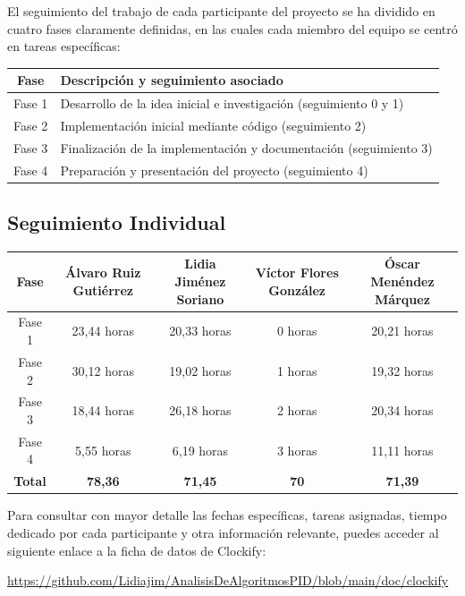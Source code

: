 \documentclass[a4paper]{article}
\begin{document}
El seguimiento del trabajo de cada participante del proyecto se ha dividido en cuatro fases claramente definidas, en las cuales cada miembro del equipo se centró en tareas específicas:
\begin{center}
  \begin{tabular}{|c|l|}
  \hline
  \textbf{Fase} & \textbf{Descripción y seguimiento asociado} \\
  \hline
  Fase 1 & Desarrollo de la idea inicial e investigación (seguimiento 0 y 1) \\
  Fase 2 & Implementación inicial mediante código (seguimiento 2) \\
  Fase 3 & Finalización de la implementación y documentación (seguimiento 3) \\
  Fase 4 & Preparación y presentación del proyecto (seguimiento 4) \\
  \hline
  \end{tabular}
  \end{center}

  \subsection*{Seguimiento Individual}

  \begin{center}
  \begin{tabular}{|c|c|c|c|c|}
  \hline
  Fase & Álvaro Ruiz Gutiérrez & Lidia Jiménez Soriano & Víctor Flores González & Óscar Menéndez Márquez \\
  \hline
  Fase 1 & 23,44 horas & 20,33 horas& 0 horas& 20,21 horas\\
  Fase 2 & 30,12 horas & 19,02 horas& 1 horas& 19,32 horas\\
  Fase 3 & 18,44 horas& 26,18 horas & 2 horas& 20,34 horas\\
  Fase 4 & 5,55 horas& 6,19 horas & 3 horas& 11,11 horas\\
  \hline
  \textbf{Total} & \textbf{78,36} & \textbf{71,45} & \textbf{70} & \textbf{71,39} \\
  \hline
  \end{tabular}
  \end{center}
  

Para consultar con mayor detalle las fechas específicas, tareas asignadas, tiempo dedicado por cada participante 
y otra información relevante, puedes acceder al siguiente enlace a la ficha de datos de Clockify: 


\begin{center}
    \url{https://github.com/Lidiajim/AnalisisDeAlgoritmosPID/blob/main/doc/clockify}
\end{center}
\end{document}
